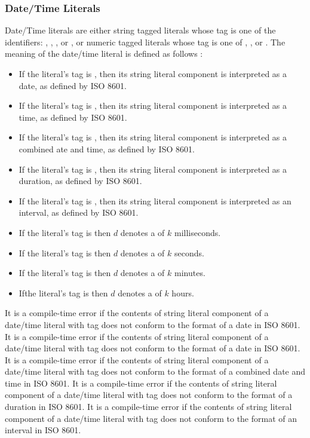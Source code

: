 \documentclass{article}
\begin{document}
\subsubsection{Date/Time Literals}
\label{dateTimeLiterals}

Date/Time literals are either  string tagged literals whose tag is one of the identifiers: \DATE, \TIME, \TIMESTAMP, \DURATION{} or \INTERVAL{}, or numeric tagged literals whose tag is one of  \MILLISECOND, \SECOND, \MINUTE{} or \HOUR. The meaning of the date/time  literal is defined as follows :

\begin{itemize}
\item If the literal's tag is \DATE, then its string literal component is interpreted as a date,  as defined by ISO 8601.
\item If the literal's tag is \TIME, then its string literal component is interpreted as a time,  as defined by ISO 8601.
\item If the literal's tag is \TIMESTAMP, then its string literal component is interpreted as a combined ate and time,  as defined by ISO 8601.
\item If the literal's tag is \DURATION, then its string literal component is interpreted as a duration,  as defined by ISO 8601.
\item If the literal's tag is \INTERVAL, then its string literal component is interpreted as an interval,  as defined by ISO 8601.
 \item If the literal's tag is \MILLISECOND{} then $d$ denotes a \DURATION{} of $k$ milliseconds.
 \item If the literal's tag is \SECOND{} then $d$ denotes a \DURATION{}  of $k$ seconds.
 \item If the literal's tag is \MINUTE{} then $d$ denotes a \DURATION{}  of $k$ minutes.             
  \item Ifthe literal's tag is  \HOUR{} then $d$ denotes a \DURATION{}  of $k$ hours.    
\end{itemize}

It is a compile-time error if the contents of string literal component of a date/time literal with tag \DATE{}  does not conform to the format of a date in ISO 8601. It is a compile-time error if the contents of string literal component of a date/time literal with tag \TIME{}  does not conform to the format of a date in ISO 8601. It is a compile-time error if the contents of string literal component of a date/time literal with tag \TIMESTAMP{}  does not conform to the format of a combined date and time in ISO 8601. It is a compile-time error if the contents of string literal component of a date/time literal with tag \DURATION{}  does not conform to the format of a duration in ISO 8601. It is a compile-time error if the contents of string literal component of a date/time literal with tag \INTERVAL{}  does not conform to the format of an interval in ISO 8601.
\end{document}
